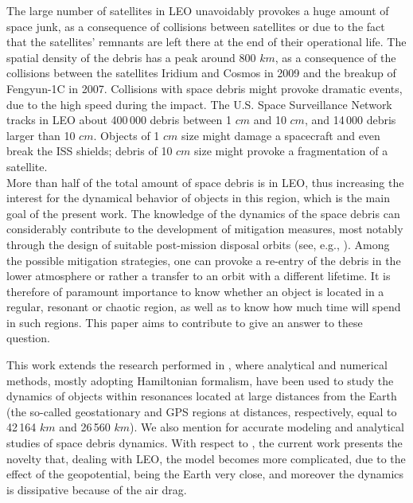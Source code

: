 \documentclass[12pt,reqno]{amsart}
\numberwithin{equation}{section}
\begin{document}
The large number of satellites in LEO unavoidably provokes a huge
amount of space junk, as a consequence of collisions
between satellites or due to the fact that the satellites' remnants are left
there at the end of their
operational life. The spatial density of the debris has a peak
around 800 $km$, as a consequence of the collisions between the satellites
Iridium and Cosmos in 2009 and the breakup of Fengyun-1C in 2007.
Collisions with space debris might provoke dramatic events, due to
the high speed during the impact. The U.S. Space Surveillance Network
tracks in LEO about 400\,000 debris between 1 $cm$ and 10 $cm$, and 14\,000
debris larger than 10 $cm$. Objects of 1 $cm$ size might damage
a spacecraft and even break the ISS shields; debris of 10 $cm$ size
might provoke a fragmentation of a satellite.\\

More than half of the total amount of space debris
is in LEO, thus increasing the interest for the dynamical behavior
of objects in this region, which is the main goal of the present work.
The knowledge of the dynamics of the space debris can considerably
contribute to the development of mitigation measures, most notably
through the design of suitable post-mission disposal orbits
(see, e.g., \cite{DSBS}).
Among the possible mitigation strategies, one can provoke a re-entry of the debris in the lower atmosphere
or rather a transfer to an orbit with a different lifetime.
It is therefore of paramount importance to know whether an object is
located in a regular, resonant or chaotic region, as well as to know
how much time will spend in such regions. This paper aims to contribute
to give an answer to these question.


This work extends the research performed in \cite{CGmajor,CGminor}, where analytical and
numerical methods, mostly adopting Hamiltonian formalism, have been used to study
the dynamics of objects within resonances located at large distances from the
Earth (the so-called geostationary and GPS regions at distances, respectively, equal
to 42\,164 $km$ and 26\,560 $km$). We also mention \cite{EH, FV, LDV, VDLC} for
accurate modeling and analytical studies of space debris dynamics. With respect
to \cite{CGmajor,CGminor}, the current work presents the novelty that, dealing with LEO,
the model becomes more complicated, due to the effect of the geopotential, being
the Earth very close, and moreover the dynamics is dissipative because of
the air drag.
\end{document}
